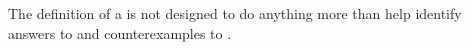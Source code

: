 \begin{note}
  The definition of a \requ{} is not designed to do anything more than help identify answers to \qWhyV{} and counterexamples to \issueConstraint{}.
\end{note}






